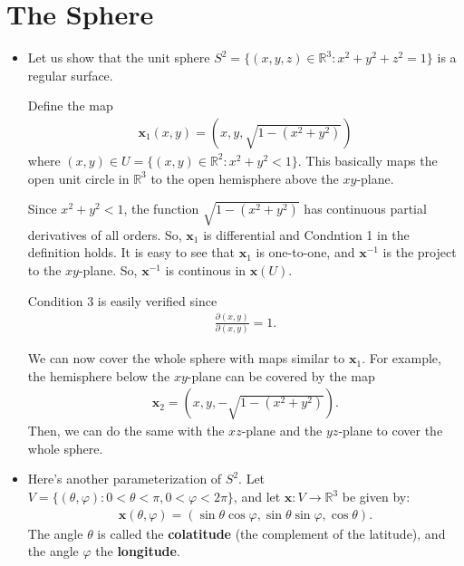 \documentclass[10pt]{article}
\newcommand{\ve}[1]{\mathbf{#1}}
\newcommand{\ra}{\rightarrow}
\newcommand{\Real}{\mathbb{R}}
\begin{document}
  \section{The Sphere}
  \begin{itemize}
    \item Let us show that the unit sphere $S^2 = \{(x,y,z) \in \Real^3 : x^2 + y^2 + z^2 = 1\}$ is a regular surface.

    Define the map
    \begin{align*}
      \ve{x}_1(x,y) = (x, y, \sqrt{1 - (x^2 + y^2)} )
    \end{align*}
    where $(x,y) \in U = \{ (x,y) \in \Real^2 : x^2 + y^2 < 1\}$. This basically maps the open unit circle in $\Real^3$ to the open hemisphere above the $xy$-plane.

    Since $x^2 + y^2 < 1$, the function $\sqrt{1 - (x^2 + y^2)}$ has continuous partial derivatives of all orders. So, $\ve{x}_1$ is differential and Condntion 1 in the definition holds. It is easy to see that $\ve{x}_1$ is one-to-one, and $\ve{x}^{-1}$ is the project to the $xy$-plane. So, $\ve{x}^{-1}$ is continous in $\ve{x}(U)$.

    Condition 3 is easily verified since
    \begin{align*}
      \frac{\partial(x,y)}{\partial(x,y)} = 1.
    \end{align*}

    We can now cover the whole sphere with maps similar to $\ve{x}_1$. For example, the hemisphere below the $xy$-plane can be covered by the map
    \begin{align*}
      \ve{x}_2 = (x, y, -\sqrt{1 - (x^2 + y^2)}).
    \end{align*}
    Then, we can do the same with the $xz$-plane and the $yz$-plane to cover the whole sphere.

    \item Here's another parameterization of $S^2$. Let $V = \{ (\theta, \varphi) : 0 < \theta < \pi, 0 < \varphi < 2\pi \}$, and let $\ve{x} : V \ra \Real^3$ be given by:
    \begin{align*}
      \ve{x}(\theta,\varphi) = (\sin \theta \cos \varphi, \sin\theta \sin \varphi, \cos\theta).
    \end{align*}
    The angle $\theta$ is called the {\bf colatitude} (the complement of the latitude), and the angle $\varphi$ the {\bf longitude}.


\end{itemize}
\end{document}
